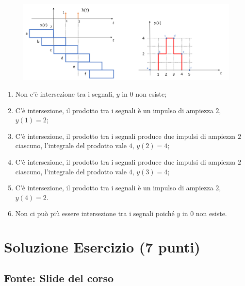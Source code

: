 \documentclass[a4paper]{article}
\begin{document}
	\begin{figure}[!htp]
		\centering
		\includegraphics[width=\textwidth]{img/convoluzione.PNG}
	\end{figure}
	\begin{enumerate}[label=\alph*.]
		\item Non c'è intersezione tra i segnali, $y$ in $0$ non esiste;
		\item C'è intersezione, il prodotto tra i segnali è un impulso di ampiezza $2$, $y\left(1\right) = 2$;
		\item C'è intersezione, il prodotto tra i segnali produce due impulsi di ampiezza $2$ ciascuno, l'integrale del prodotto vale $4$, $y\left(2\right) = 4$;
		\item C'è intersezione, il prodotto tra i segnali produce due impulsi di ampiezza $2$ ciascuno, l'integrale del prodotto vale $4$, $y\left(3\right) = 4$;
		\item C'è intersezione, il prodotto tra i segnali è un impulso di ampiezza $2$, $y\left(4\right) = 2$.
		\item Non ci può più essere intersezione tra i segnali poiché $y$ in $0$ non esiste.
	\end{enumerate}\newpage

	\section{Soluzione Esercizio (7 punti)}
	\subsection*{Fonte: Slide del corso}
\end{document}
